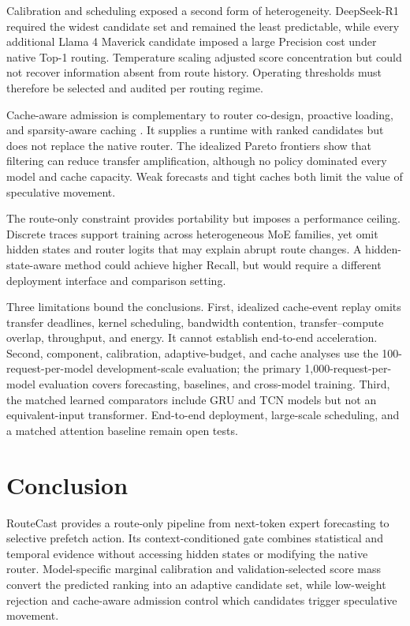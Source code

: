 \documentclass[conference]{IEEEtran}
\begin{document}
Calibration and scheduling exposed a second form of heterogeneity.
DeepSeek-R1 required the widest candidate set and remained the least
predictable, while every additional Llama 4 Maverick candidate imposed a large
Precision cost under native Top-1 routing. Temperature scaling adjusted score
concentration but could not recover information absent from route history.
Operating thresholds must therefore be selected and audited per routing
regime.

Cache-aware admission is complementary to router co-design, proactive loading,
and sparsity-aware caching \cite{pregated,moeinfinity,promoe}. It supplies a
runtime with ranked candidates but does not replace the native router. The
idealized Pareto frontiers show that filtering can reduce transfer
amplification, although no policy dominated every model and cache capacity.
Weak forecasts and tight caches both limit the value of speculative movement.

The route-only constraint provides portability but imposes a performance
ceiling. Discrete traces support training across heterogeneous MoE families,
yet omit hidden states and router logits that may explain abrupt route changes.
A hidden-state-aware method could achieve higher Recall, but would require a
different deployment interface and comparison setting.

Three limitations bound the conclusions. First, idealized cache-event replay
omits transfer deadlines, kernel scheduling, bandwidth contention,
transfer--compute overlap, throughput, and energy. It cannot establish
end-to-end acceleration. Second, component, calibration, adaptive-budget, and
cache analyses use the 100-request-per-model development-scale evaluation;
the primary 1,000-request-per-model evaluation covers forecasting, baselines,
and cross-model training. Third, the matched learned comparators include GRU
and TCN models but not an equivalent-input transformer. End-to-end deployment,
large-scale scheduling, and a matched attention baseline remain open tests.

\section{Conclusion}

RouteCast provides a route-only pipeline from next-token expert forecasting to
selective prefetch action. Its context-conditioned gate combines statistical
and temporal evidence without accessing hidden states or modifying the native
router. Model-specific marginal calibration and validation-selected score mass
convert the predicted ranking into an adaptive candidate set, while low-weight
rejection and cache-aware admission
control which candidates trigger speculative movement.
\end{document}
